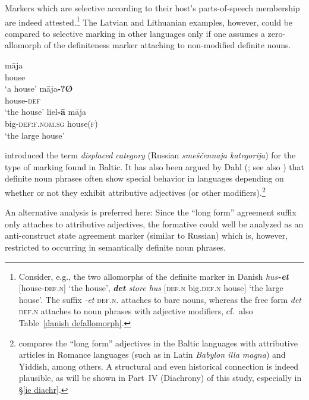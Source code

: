 Markers which are selective according to their host's parts-of-speech membership are indeed attested.\footnote{Consider, e.g., the two allomorphs of the definite marker in Danish \textit{hus\textbf{-et}} [house-\textsc{def.n}] ‘the house’, \textit{\textbf{det} store hus} [\textsc{def.n} big\textsc{.def.n} house] ‘the large house’. The suffix \textit{-et} \textsc{def.n.} attaches to bare nouns, whereas the free form \textit{det} \textsc{def.n} attaches to noun phrases with adjective modifiers, cf.~also Table~\ref{danish defallomorph}.} The Latvian and Lithuanian examples, however, could be compared to selective marking in other languages only if one assumes a zero-allomorph of the definiteness marker attaching to non-modified definite nouns.
\begin{exe}
\ex
{}
\begin{xlist}
\ex
\gll 	māja\\
	house\\
\glt	‘a house’
\ex	
\gll 	māja\textbf{-?Ø}\\
	house-\textsc{def}\\
\glt	‘the house’
\ex		
\gll 	liel\textbf{-ā} māja\\
	big-\textsc{def:f.nom.sg} house(\textsc{f})\\
\glt	‘the large house’
\end{xlist}
\end{exe}
\citet[31]{melcuk1998} introduced the term \emph{displaced category} (Russian \emph{smeščennaja kategorija}) for the type of marking found in Baltic. It has also been argued by Dahl (\citeyear[149–152]{dahl2003}; see also \citealt[122–123]{dahl2015a}) that definite noun phrases often show special behavior in languages depending on whether or not they exhibit attributive adjectives (or other modifiers).\footnote{\citet[150]{dahl2003} compares the “long form” adjectives in the Baltic languages with attributive articles in Romance languages (such as in Latin \textit{Babylon illa magna}) and Yiddish, among others. A structural and even historical connection is indeed plausible, as will be shown in Part~IV (Diachrony) of this study, especially in \S\ref{ie diachr}.}

An alternative analysis is preferred here: Since the “long form” agreement suffix only attaches to attributive adjectives, the formative could well be analyzed as an anti\hyp{}construct state agreement marker (similar to Russian) which is, however, restricted to occurring in semantically definite noun phrases. 

